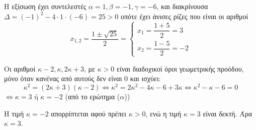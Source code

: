 
\begin{alist}
\item Η εξίσωση έχει συντελεστές $\alpha = 1, \beta = -1, \gamma = -6$, και διακρίνουσα $\Delta = (-1)^2 - 4 \cdot 1 \cdot (-6) = 25 > 0$ οπότε έχει άνισες ρίζες που είναι οι αριθμοί
\[x_{1,2} = \dfrac{1 \pm \sqrt{25}}{2} = \begin{cases} x_1 = \dfrac{1+5}{2} = 3 \\ x_2 = \dfrac{1-5}{2} = -2 \end{cases}\]

\item Οι αριθμοί $\kappa - 2, \kappa, 2\kappa + 3$, με $\kappa > 0$ είναι διαδοχικοί όροι γεωμετρικής προόδου, μόνο όταν κανένας από αυτούς δεν είναι $0$ και ισχύει:
\[\kappa^2 = (2\kappa + 3)(\kappa - 2) \Leftrightarrow \kappa^2 = 2\kappa^2 - 4\kappa - 6 + 3\kappa \Leftrightarrow \kappa^2 - \kappa - 6 = 0\]
$\Leftrightarrow \kappa = 3 \text{ ή } \kappa = -2$ (από το ερώτημα ($\alpha$))

Η τιμή $\kappa = -2$ απορρίπτεται αφού πρέπει $\kappa > 0$, ενώ η τιμή $\kappa = 3$ είναι δεκτή. Άρα $\kappa = 3$.
\end{alist}

